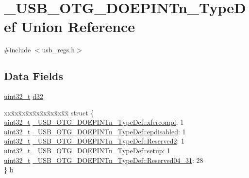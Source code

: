 \hypertarget{union___u_s_b___o_t_g___d_o_e_p_i_n_tn___type_def}{\section{\-\_\-\-U\-S\-B\-\_\-\-O\-T\-G\-\_\-\-D\-O\-E\-P\-I\-N\-Tn\-\_\-\-Type\-Def Union Reference}
\label{union___u_s_b___o_t_g___d_o_e_p_i_n_tn___type_def}
}


{\ttfamily \#include $<$usb\-\_\-regs.\-h$>$}

\subsection*{Data Fields}
\begin{DoxyCompactItemize}
\item 
\hyperlink{stdint_8h_a435d1572bf3f880d55459d9805097f62}{uint32\-\_\-t} \hyperlink{group___u_s_b___o_t_g___d_r_i_v_e_r_ga6a2af3648bfb97391f2a267df8bd3204}{d32}
\item 
\begin{tabbing}
xx\=xx\=xx\=xx\=xx\=xx\=xx\=xx\=xx\=\kill
struct \{\\
\>\hyperlink{stdint_8h_a435d1572bf3f880d55459d9805097f62}{uint32\_t} \hyperlink{group___u_s_b___o_t_g___d_r_i_v_e_r_gaaca4cf95c7b4adf7ca9ec0895ba5360d}{\_USB\_OTG\_DOEPINTn\_TypeDef::xfercompl}: 1\\
\>\hyperlink{stdint_8h_a435d1572bf3f880d55459d9805097f62}{uint32\_t} \hyperlink{group___u_s_b___o_t_g___d_r_i_v_e_r_ga8fa33d9d00b0398bb9cffbeef8ed78a9}{\_USB\_OTG\_DOEPINTn\_TypeDef::epdisabled}: 1\\
\>\hyperlink{stdint_8h_a435d1572bf3f880d55459d9805097f62}{uint32\_t} \hyperlink{group___u_s_b___o_t_g___d_r_i_v_e_r_ga9032caa3217578a7f7660b1b5489fea7}{\_USB\_OTG\_DOEPINTn\_TypeDef::Reserved2}: 1\\
\>\hyperlink{stdint_8h_a435d1572bf3f880d55459d9805097f62}{uint32\_t} \hyperlink{group___u_s_b___o_t_g___d_r_i_v_e_r_ga1fcadb3c98fdf26e6e29a2ee7611ee01}{\_USB\_OTG\_DOEPINTn\_TypeDef::setup}: 1\\
\>\hyperlink{stdint_8h_a435d1572bf3f880d55459d9805097f62}{uint32\_t} \hyperlink{group___u_s_b___o_t_g___d_r_i_v_e_r_gaf42d3169ce0fb063fbccbbc7ad0efd57}{\_USB\_OTG\_DOEPINTn\_TypeDef::Reserved04\_31}: 28\\
\} \hyperlink{group___u_s_b___o_t_g___d_r_i_v_e_r_ga65eb652509ab57b76a58d01d894ceba2}{b}\\

\end{tabbing}\end{DoxyCompactItemize}


